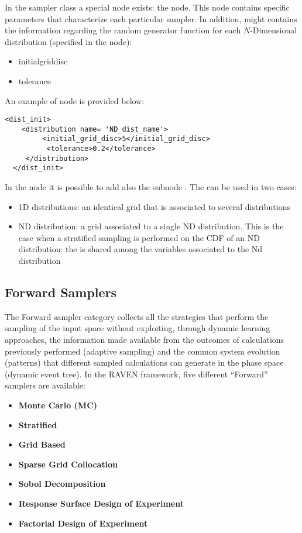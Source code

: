 In the sampler class a special node exists: the  node.
This node contains specific parameters that characterize each particular sampler.
In addition,  might contains the information regarding the random generator function for each $N$-Dimensional distribution (specified in the  node):
\begin{itemize}
\item initial\textunderscore grid\textunderscore disc
\item tolerance
\end{itemize}

An example of  node is provided below:

\begin{lstlisting}[style=XML]
<dist_init>
    <distribution name= 'ND_dist_name'>
         <initial_grid_disc>5</initial_grid_disc>
          <tolerance>0.2</tolerance>
     </distribution>
  </dist_init>
\end{lstlisting}

In the   node it is possible to add also the subnode .
The  can be used in two cases:
\begin{itemize}
\item 1D distributions: an identical grid that is associated to several distributions
\item ND distribution: a grid associated to a single ND distribution. This is the case when a stratified sampling is performed on the CDF of an ND distribution: the   is  shared among the variables associated to the Nd distribution
\end{itemize}

\subsection{Forward Samplers}
\label{subsec:onceThroughSamplers}
The Forward sampler category collects all the strategies that perform the
sampling of the input space without exploiting, through dynamic learning
approaches, the information made available from the outcomes of calculations
previously performed (adaptive sampling) and the common system evolution
(patterns) that different sampled calculations can generate in the phase space
(dynamic event tree).
%
In the RAVEN framework, five different “Forward” samplers
are available:
\begin{itemize}
\item \textbf{Monte Carlo (MC)}
\item \textbf{Stratified}
\item \textbf{Grid Based}
\item \textbf{Sparse Grid Collocation}
\item \textbf{Sobol Decomposition}
\item \textbf{Response Surface Design of Experiment}
\item \textbf{Factorial Design of Experiment}
\end{itemize}

